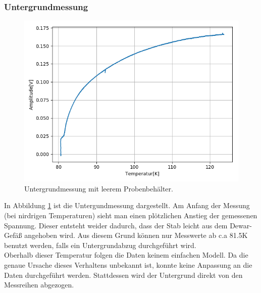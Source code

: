 \documentclass[12pt,a4paper]{article}
\begin{document}
\subsubsection{Untergrundmessung}
\begin{figure}
\centering
\includegraphics[scale=0.8]{Bilder/Haupt_Supra/Untergrund.png}
\caption{Untergrundmessung mit leerem Probenbehälter.}
\label{fig:Supra_Untergrund}
\end{figure}

In Abbildung \ref{fig:Supra_Untergrund} ist die Untergundmessung dargestellt. Am Anfang der Messung (bei nirdrigen Temperaturen) sieht man einen plötzlichen Anstieg der gemessenen Spannung. Dieser entsteht weider dadurch, dass der Stab leicht aus dem Dewar-Gefäß angehoben wird. Aus diesem Grund können nur Messwerte ab c.a 81.5K benutzt werden, falls ein Untergrundabzug durchgeführt wird.\\
Oberhalb dieser Temperatur folgen die Daten keinem einfachen Modell. Da die genaue Ursache dieses Verhaltens unbekannt ist, konnte keine Anpassung an die Daten durchgeführt werden. Stattdessen wird der Untergrund direkt von den Messreihen abgezogen.
\end{document}
